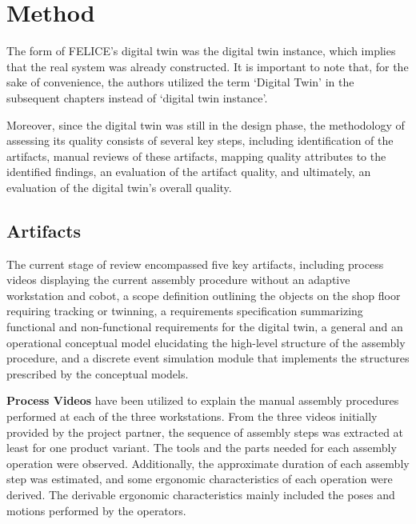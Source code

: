 \documentclass{llncs}
\begin{document}
    \section{Method}
    The form of FELICE's digital twin was the digital twin instance\cite{GrievesVickers2017}, 
    which implies that the real system was already constructed. 
    It is important to note that, for the sake of convenience, 
    the authors utilized the term `Digital Twin' in the subsequent chapters instead of `digital twin instance'.

    Moreover, since the digital twin was still in the design phase, 
    the methodology of assessing its quality consists of several key steps,
    including identification of the artifacts, manual reviews of these artifacts, 
    mapping quality attributes to the identified findings, an evaluation of the artifact quality, and ultimately, 
    an evaluation of the digital twin's overall quality.
    \subsection{Artifacts}\label{section:Artifacts}
    The current stage of review encompassed five key artifacts,
    including process videos displaying the current assembly procedure without an adaptive workstation and cobot,
    a scope definition outlining the objects on the shop floor requiring tracking or twinning, a requirements 
    specification summarizing functional and non-functional requirements for the digital twin, a general and an operational 
    conceptual model elucidating the high-level structure of the assembly procedure, 
    and a discrete event simulation module that implements the structures prescribed by the conceptual models.

    \textbf{Process Videos} have been utilized to explain the manual assembly procedures performed at each of the three workstations. From the three videos initially provided by the project partner,  
    the sequence of assembly steps was extracted at least for one product variant. The tools and the parts needed for each assembly operation were observed. Additionally, the approximate duration of each assembly step 
    was estimated, and some ergonomic characteristics of each operation were derived. 
    The derivable ergonomic characteristics mainly included the poses and motions performed by the operators.
\end{document}
